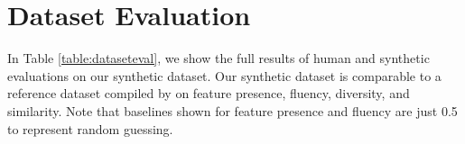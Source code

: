 \section{Dataset Evaluation}
\label{sec:appendix:dataseteval}

In Table \ref{table:dataseteval}, we show the full results of human and synthetic evaluations on our synthetic dataset. Our synthetic dataset is comparable to a reference dataset compiled by \citet{scherrer-2020-tapaco} on feature presence, fluency, diversity, and similarity. Note that baselines shown for feature presence and fluency are just 0.5 to represent random guessing.


